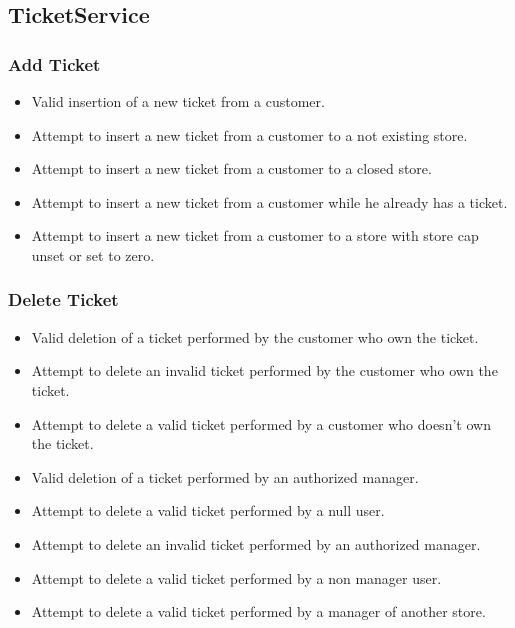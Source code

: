 \subsection{TicketService}
\subsubsection{Add Ticket}
\begin{itemize}
	\item Valid insertion of a new ticket from a customer.
	\item Attempt to insert a new ticket from a customer to a not existing store.
	\item Attempt to insert a new ticket from a customer to a closed store.
	\item Attempt to insert a new ticket from a customer while he already has a ticket.
	\item Attempt to insert a new ticket from a customer to a store with store cap unset or set to zero.
\end{itemize}

\subsubsection{Delete Ticket}
\begin{itemize}
	\item Valid deletion of a ticket performed by the customer who own the ticket.
	\item Attempt to delete an invalid ticket performed by the customer who own the ticket.
	\item Attempt to delete a valid ticket performed by a customer who doesn't own the ticket.
	\item Valid deletion of a ticket performed by an authorized manager.
	\item Attempt to delete a valid ticket performed by a null user.
	\item Attempt to delete an invalid ticket performed by an authorized manager.
	\item Attempt to delete a valid ticket performed by a non manager user.
	\item Attempt to delete a valid ticket performed by a manager of another store.
\end{itemize}

